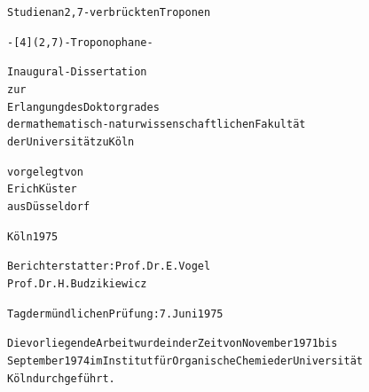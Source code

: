 \documentclass[a4paper,11pt]{article}
\begin{document}
\begin{alltt}
\begin{center}



Studien an 2,7-verbrückten Troponen

- [4](2,7)-Troponophane -



Inaugural-Dissertation
zur
Erlangung des Doktorgrades
der mathematisch-naturwissenschaftlichen Fakultät
der Universität zu Köln

vorgelegt von
Erich Küster
aus Düsseldorf



Köln 1975

\end{center}
\newpage

\end{alltt}
\vspace{22cm}
\begin{alltt}
Berichterstatter: Prof. Dr. E. Vogel
                  Prof. Dr. H. Budzikiewicz

Tag der mündlichen Prüfung: 7. Juni 1975
\end{alltt}
\newpage
\begin{alltt}




Die vorliegende Arbeit wurde in der Zeit von November 1971 bis
September 1974 im Institut für Organische Chemie der Universität
Köln durchgeführt.
\end{alltt}
\vspace{20cm}
\end{document}
